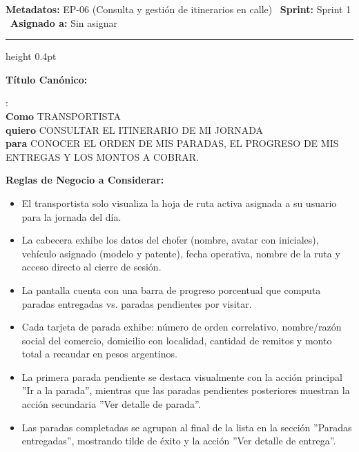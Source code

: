 \documentclass[a4paper,9pt]{article}
\begin{document}
\begin{tcolorbox}[hucard, title={\textbf{HU-62: CONSULTAR ITINERARIO} \hfill \scriptsize \colorbox{tealstatus}{\textbf{\ Accepted\ }} \quad \colorbox{white}{\textcolor{primarydark}{\textbf{\ 2 pts\ }}}}]
\vspace{-1pt}
\noindent\textbf{\footnotesize Metadatos:} EP-06 (Consulta y gestión de itinerarios en calle) \textbar\ \textbf{Sprint:} Sprint 1 \textbar\ \textbf{Asignado a:} Sin asignar\par\vspace{2pt}
\hrule height 0.4pt\par\vspace{3pt}
\noindent\textbf{\footnotesize Título Canónico:}\par\vspace{1pt}
{\small : \\ \textbf{Como} TRANSPORTISTA \\ \textbf{quiero} CONSULTAR EL ITINERARIO DE MI JORNADA \\ \textbf{para} CONOCER EL ORDEN DE MIS PARADAS, EL PROGRESO DE MIS ENTREGAS Y LOS MONTOS A COBRAR.}\par\vspace{3pt}
\noindent\textbf{\footnotesize Reglas de Negocio a Considerar:}\par\vspace{1pt}
{\footnotesize
\begin{itemize}[leftmargin=12pt, nosep, itemsep=1.5pt, topsep=1pt]
\item El transportista solo visualiza la hoja de ruta activa asignada a su usuario para la jornada del día.
\item La cabecera exhibe los datos del chofer (nombre, avatar con iniciales), vehículo asignado (modelo y patente), fecha operativa, nombre de la ruta y acceso directo al cierre de sesión.
\item La pantalla cuenta con una barra de progreso porcentual que computa paradas entregadas vs. paradas pendientes por visitar.
\item Cada tarjeta de parada exhibe: número de orden correlativo, nombre/razón social del comercio, domicilio con localidad, cantidad de remitos y monto total a recaudar en pesos argentinos.
\item La primera parada pendiente se destaca visualmente con la acción principal ''Ir a la parada'', mientras que las paradas pendientes posteriores muestran la acción secundaria ''Ver detalle de parada''.
\item Las paradas completadas se agrupan al final de la lista en la sección ''Paradas entregadas'', mostrando tilde de éxito y la acción ''Ver detalle de entrega''.

\end{itemize}}
\end{tcolorbox}
\end{document}
